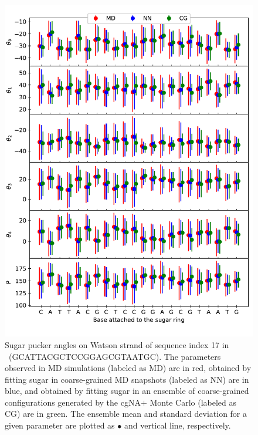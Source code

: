 \begin{figure}[H]
	\begin{center}
	\includegraphics[width=15cm]{images/puck_stats_17_1.pdf}
	\caption{Sugar pucker angles on Watson strand of sequence index 17 in \Lbdna \ (GCATTACGCTCCGGAGCGTAATGC). 
    The parameters observed in MD simulations (labeled as MD) are in red, obtained by fitting sugar in coarse-grained MD snapshots (labeled as NN) are in blue, and obtained by fitting sugar in an ensemble of coarse-grained configurations generated by the cgNA$+$ Monte Carlo (labeled as CG) are in green. 
    The ensemble mean and standard deviation for a given parameter are plotted as $\bullet$ and vertical line, respectively.}
\label{c7:fig4}
\end{center}
\end{figure}

